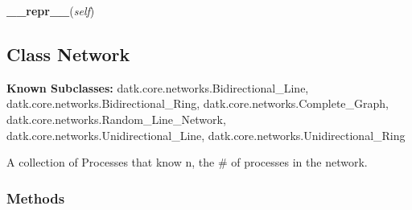     \vspace{0.5ex}

\hspace{.8\funcindent}\begin{boxedminipage}{\funcwidth}

    \raggedright \textbf{\_\_repr\_\_}(\textit{self})

\setlength{\parskip}{2ex}
\setlength{\parskip}{1ex}
    \end{boxedminipage}



\subsection{Class Network}

    \label{datk:core:distalgs:Network}
\textbf{Known Subclasses:}
datk.core.networks.Bidirectional\_Line,
    datk.core.networks.Bidirectional\_Ring,
    datk.core.networks.Complete\_Graph,
    datk.core.networks.Random\_Line\_Network,
    datk.core.networks.Unidirectional\_Line,
    datk.core.networks.Unidirectional\_Ring

A collection of Processes that know n, the \# of processes in the network.



  \subsubsection{Methods}

    \label{datk:core:distalgs:Network:__getitem__}

